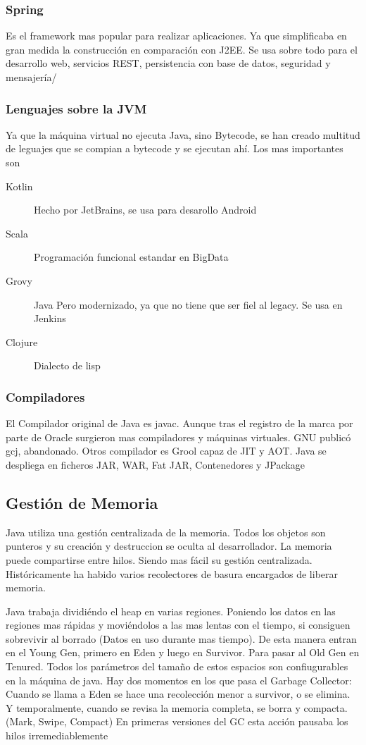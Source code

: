     \subsubsection{Spring}
        Es el framework  mas popular para realizar aplicaciones. Ya que simplificaba en gran medida la construcción en comparación con J2EE. Se usa sobre todo para el desarrollo web, servicios REST, persistencia con base de datos, seguridad y mensajería/

    \subsubsection{Lenguajes sobre la JVM}
        Ya que la máquina virtual no ejecuta Java, sino Bytecode, se han creado multitud de leguajes que se compian a bytecode y se ejecutan ahí. Los mas importantes son
        \begin{description}
            \item[Kotlin] Hecho por JetBrains, se usa para desarollo Android
            \item[Scala] Programación funcional estandar en BigData
            \item[Grovy] Java Pero modernizado, ya que no tiene que ser fiel al legacy. Se usa en Jenkins
            \item[Clojure] Dialecto de lisp
        \end{description}

    \subsubsection{Compiladores}
        El Compilador original de Java es \textsf{javac}. Aunque tras el registro de la marca por parte de Oracle surgieron mas compiladores y máquinas virtuales. GNU publicó \textsf{gcj}, abandonado. Otros compilador es \textsf{Grool} capaz de JIT y AOT. Java se despliega en ficheros JAR, WAR, Fat JAR, Contenedores y JPackage

\subsection{Gestión de Memoria}
    Java utiliza una gestión centralizada de la memoria. Todos los objetos son punteros y su creación y destruccion se oculta al desarrollador. La memoria puede compartirse entre hilos. Siendo mas fácil su gestión centralizada. Históricamente ha habido varios recolectores de basura encargados de liberar memoria.

    Java trabaja dividiéndo el heap en varias regiones. Poniendo los datos en las regiones mas rápidas y moviéndolos a las mas lentas con el tiempo, si consiguen sobrevivir al borrado (Datos en uso durante mas tiempo). De esta manera entran en el Young Gen, primero en Eden y luego en Survivor. Para pasar al Old Gen en Tenured. Todos los parámetros del tamaño de estos espacios son confiugurables en la máquina de java. Hay dos momentos en los que pasa el Garbage Collector: Cuando se llama a Eden se hace una recolección menor a survivor, o se elimina. Y temporalmente, cuando se revisa la memoria completa, se borra y compacta. (Mark, Swipe, Compact) En primeras versiones del GC esta acción pausaba los hilos irremediablemente